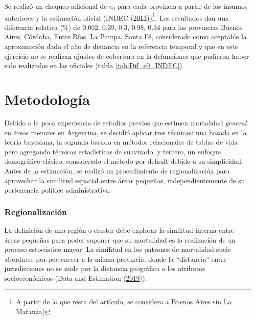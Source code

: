 \documentclass[12pt,]{article}
\begin{document}
Se realizó un chequeo adicional de \(e_0\) para cada provincia a partir
de los insumos anteriores y la estimación oficial (INDEC
(\protect\hyperlink{ref-INDEC2013}{2013}))\footnote{A partir de lo que
  resta del artículo, se considera a Buenos Aires sin La Matanza)}. Los
resultados dan una diferencia relativa (\%) de 0,002, 0.39, 0.3, 0.98,
0.34 para las provincias Buenos Aires, Córdoba, Entre Ríos, La Pampa,
Santa Fé, considerado como aceptable la aproximación dado el año de
distancia en la referencia temporal y que en este ejercicio no se
realizan ajustes de cobertura en la defunciones que pudieron haber sido
realizados en las oficiales (tabla \ref{tab:Dif_e0_INDEC}).

\hypertarget{metodologuxeda}{%
\section{\texorpdfstring{\textbf{Metodología}}{Metodología}}\label{metodologuxeda}}

Debido a la poca experiencia de estudios previos que estimen mortalidad
\emph{general} en áreas menores en Argentina, se decidió aplicar tres
técnicas: una basada en la teoría bayesiana, la segunda basada en
métodos relacionales de tablas de vida pero agregando técnicas
estadísticas de suavizado, y tercero, un enfoque demográfico clásico,
considerado el método por default debido a su simplicidad. Antes de la
estimación, se realizó un procedimiento de regionalización para
aprovechar la similitud espacial entre áreas pequeñas,
independientemente de su pertenencia político-administrativa.

\hypertarget{regionalizaciuxf3n}{%
\subsubsection{\texorpdfstring{\textbf{Regionalización}}{Regionalización}}\label{regionalizaciuxf3n}}

La definición de una región o cluster debe explorar la similitud interna
entre áreas pequeñas para poder suponer que su mortalidad es la
realización de un proceso estocástico mayor. La similitud en los
patrones de mortalidad suele abordarse por pertenecer a la misma
provincia, donde la ``distancia'' entre jurisdicciones no se mide por la
distancia geográfica o los atributos socioeconómicos (Data and
Estimation (\protect\hyperlink{ref-Longford2005}{2019})).
\end{document}
